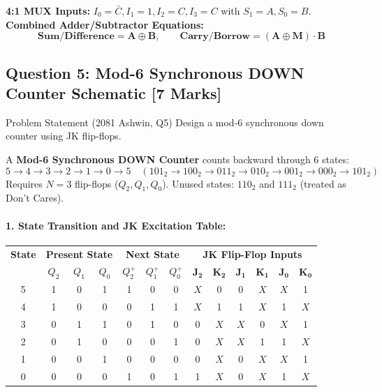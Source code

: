 \documentclass[11pt,a4paper,oneside]{book}
\begin{document}
\begin{answerbox}
\textbf{4:1 MUX Inputs:} $I_0 = \bar{C}, I_1 = 1, I_2 = C, I_3 = C$ with $S_1 = A, S_0 = B$.\\
\textbf{Combined Adder/Subtractor Equations:}
$$\mathbf{\text{Sum} / \text{Difference} = A \oplus B, \qquad \text{Carry} / \text{Borrow} = (A \oplus M) \cdot B}$$
\end{answerbox}

\vspace{0.6cm}

\subsection{Question 5: Mod-6 Synchronous DOWN Counter Schematic [7 Marks]}
\begin{questionbox}{Problem Statement (2081 Ashwin, Q5)}
Design a mod-6 synchronous down counter using JK flip-flops.
\end{questionbox}

A \textbf{Mod-6 Synchronous DOWN Counter} counts backward through 6 states:
\[
5 \to 4 \to 3 \to 2 \to 1 \to 0 \to 5 \quad (101_2 \to 100_2 \to 011_2 \to 010_2 \to 001_2 \to 000_2 \to 101_2)
\]
Requires $N = 3$ flip-flops ($Q_2, Q_1, Q_0$). Unused states: $110_2$ and $111_2$ (treated as Don't Cares).

\paragraph{1. State Transition and JK Excitation Table:}
\begin{center}
\begin{tabular}{|c|ccc|ccc|cccccc|}
\hline
\textbf{State} & \multicolumn{3}{c|}{\textbf{Present State}} & \multicolumn{3}{c|}{\textbf{Next State}} & \multicolumn{6}{c|}{\textbf{JK Flip-Flop Inputs}} \\
& $Q_2$ & $Q_1$ & $Q_0$ & $Q_2^+$ & $Q_1^+$ & $Q_0^+$ & $\mathbf{J_2}$ & $\mathbf{K_2}$ & $\mathbf{J_1}$ & $\mathbf{K_1}$ & $\mathbf{J_0}$ & $\mathbf{K_0}$ \\ \hline
5 & 1 & 0 & 1 & 1 & 0 & 0 & $X$ & 0 & 0 & $X$ & $X$ & 1 \\ \hline
4 & 1 & 0 & 0 & 0 & 1 & 1 & $X$ & 1 & 1 & $X$ & 1 & $X$ \\ \hline
3 & 0 & 1 & 1 & 0 & 1 & 0 & 0 & $X$ & $X$ & 0 & $X$ & 1 \\ \hline
2 & 0 & 1 & 0 & 0 & 0 & 1 & 0 & $X$ & $X$ & 1 & 1 & $X$ \\ \hline
1 & 0 & 0 & 1 & 0 & 0 & 0 & 0 & $X$ & 0 & $X$ & $X$ & 1 \\ \hline
0 & 0 & 0 & 0 & 1 & 0 & 1 & 1 & $X$ & 0 & $X$ & 1 & $X$ \\ \hline
\end{tabular}
\end{center}
\end{document}
